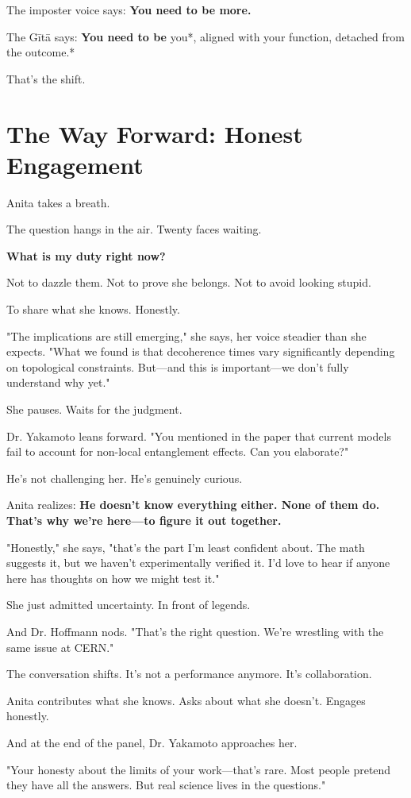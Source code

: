\documentclass[11pt,twoside]{book}
\begin{document}
The imposter voice says: \textbf{You need to be more.}

The Gītā says: \textbf{You need to be} you*, aligned with your function, detached from the outcome.*

That's the shift.

\section*{The Way Forward: Honest Engagement}

Anita takes a breath.

The question hangs in the air. Twenty faces waiting.

\textbf{What is my duty right now?}

Not to dazzle them. Not to prove she belongs. Not to avoid looking stupid.

To share what she knows. Honestly.

"The implications are still emerging," she says, her voice steadier than she expects. "What we found is that decoherence times vary significantly depending on topological constraints. But—and this is important—we don't fully understand why yet."

She pauses. Waits for the judgment.

Dr. Yakamoto leans forward. "You mentioned in the paper that current models fail to account for non-local entanglement effects. Can you elaborate?"

He's not challenging her. He's genuinely curious.

Anita realizes: \textbf{He doesn't know everything either. None of them do. That's why we're here—to figure it out together.}

"Honestly," she says, "that's the part I'm least confident about. The math suggests it, but we haven't experimentally verified it. I'd love to hear if anyone here has thoughts on how we might test it."

She just admitted uncertainty. In front of legends.

And Dr. Hoffmann nods. "That's the right question. We're wrestling with the same issue at CERN."

The conversation shifts. It's not a performance anymore. It's collaboration.

Anita contributes what she knows. Asks about what she doesn't. Engages honestly.

And at the end of the panel, Dr. Yakamoto approaches her.

"Your honesty about the limits of your work—that's rare. Most people pretend they have all the answers. But real science lives in the questions."
\end{document}
